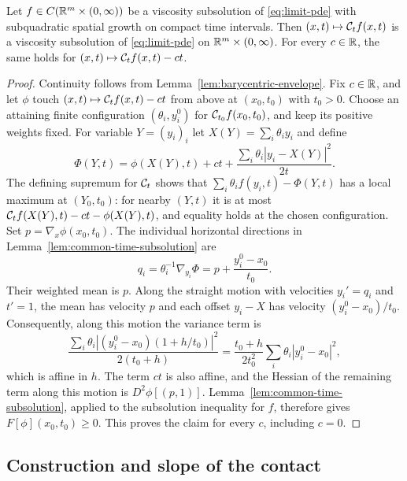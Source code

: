 \begin{corollary}\label{cor:barycentric-subsolution}
Let $f\in C(\mathbb{R}^m\times(0,\infty))$ be a viscosity subsolution of
\eqref{eq:limit-pde} with subquadratic spatial growth on compact time
intervals. Then $(x,t)\mapsto\mathcal{C}_t f(x,t)$ is a viscosity subsolution of
\eqref{eq:limit-pde} on $\mathbb{R}^m\times(0,\infty)$. For every $c\in\mathbb{R}$, the same
holds for $(x,t)\mapsto\mathcal{C}_t f(x,t)-ct$.
\end{corollary}

\begin{proof}
Continuity follows from Lemma~\ref{lem:barycentric-envelope}. Fix $c\in\mathbb{R}$,
and let $\phi$ touch $(x,t)\mapsto\mathcal{C}_t f(x,t)-ct$ from above at
$(x_0,t_0)$ with $t_0>0$. Choose an attaining finite configuration
$(\theta_i,y_i^0)$ for $\mathcal{C}_{t_0}f(x_0,t_0)$, and keep its positive weights
fixed. For variable $Y=(y_i)_i$ let $X(Y)=\sum_i\theta_i y_i$ and define
\[
  \Phi(Y,t)=\phi(X(Y),t)+ct
              +\frac{\sum_i\theta_i|y_i-X(Y)|^2}{2t}.
\]
The defining supremum for $\mathcal{C}_t$ shows that
$\sum_i\theta_i f(y_i,t)-\Phi(Y,t)$ has a local maximum at $(Y_0,t_0)$:
for nearby $(Y,t)$ it is at most
$\mathcal{C}_t f(X(Y),t)-ct-\phi(X(Y),t)$, and equality holds at the chosen
configuration. Set $p=\nabla_x\phi(x_0,t_0)$. The individual horizontal
directions in Lemma~\ref{lem:common-time-subsolution} are
\[
  q_i=\theta_i^{-1}\nabla_{y_i}\Phi
       =p+\frac{y_i^0-x_0}{t_0}.
\]
Their weighted mean is $p$. Along the straight motion with velocities
$y_i'=q_i$ and $t'=1$, the mean has velocity $p$ and each offset $y_i-X$
has velocity $(y_i^0-x_0)/t_0$. Consequently, along this motion the variance
term is
\[
  \frac{\sum_i\theta_i
           |(y_i^0-x_0)(1+h/t_0)|^2}{2(t_0+h)}
    =\frac{t_0+h}{2t_0^2}
           \sum_i\theta_i|y_i^0-x_0|^2,
\]
which is affine in $h$. The term $ct$ is also affine, and the Hessian of the
remaining term along this motion is $D^2\phi[(p,1)]$.
Lemma~\ref{lem:common-time-subsolution}, applied to the subsolution
inequality for $f$, therefore gives $F[\phi](x_0,t_0)\ge0$. This proves the
claim for every $c$, including $c=0$.
\end{proof}

\subsection{Construction and slope of the contact}

